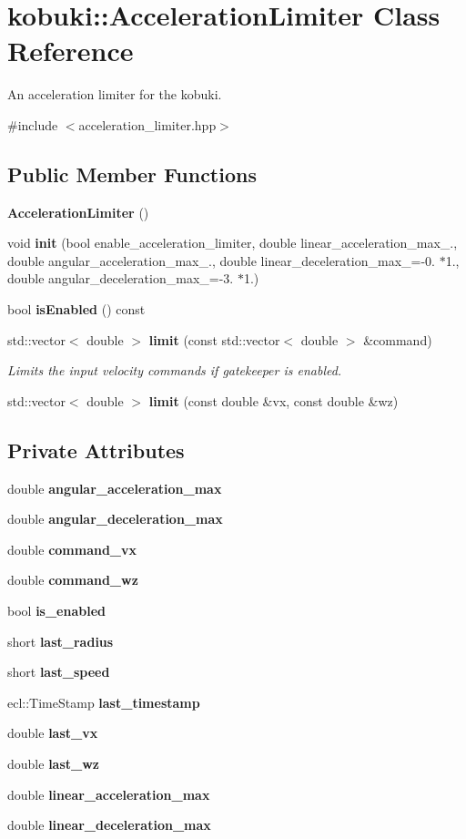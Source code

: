 \section{kobuki\-:\-:\-Acceleration\-Limiter \-Class \-Reference}
\label{classkobuki_1_1AccelerationLimiter}


\-An acceleration limiter for the kobuki.  




{\ttfamily \#include $<$acceleration\-\_\-limiter.\-hpp$>$}

\subsection*{\-Public \-Member \-Functions}
\begin{DoxyCompactItemize}
\item 
{\bf \-Acceleration\-Limiter} ()
\item 
void {\bf init} (bool enable\-\_\-acceleration\-\_\-limiter, double linear\-\_\-acceleration\-\_\-max\-\_., double angular\-\_\-acceleration\-\_\-max\-\_., double linear\-\_\-deceleration\-\_\-max\-\_\-=-\/0. $\ast$1., double angular\-\_\-deceleration\-\_\-max\-\_\-=-\/3. $\ast$1.)
\item 
bool {\bf is\-Enabled} () const 
\item 
std\-::vector$<$ double $>$ {\bf limit} (const std\-::vector$<$ double $>$ \&command)
\begin{DoxyCompactList}\small\item\em \-Limits the input velocity commands if gatekeeper is enabled. \end{DoxyCompactList}\item 
std\-::vector$<$ double $>$ {\bf limit} (const double \&vx, const double \&wz)
\end{DoxyCompactItemize}
\subsection*{\-Private \-Attributes}
\begin{DoxyCompactItemize}
\item 
double {\bf angular\-\_\-acceleration\-\_\-max}
\item 
double {\bf angular\-\_\-deceleration\-\_\-max}
\item 
double {\bf command\-\_\-vx}
\item 
double {\bf command\-\_\-wz}
\item 
bool {\bf is\-\_\-enabled}
\item 
short {\bf last\-\_\-radius}
\item 
short {\bf last\-\_\-speed}
\item 
ecl\-::\-Time\-Stamp {\bf last\-\_\-timestamp}
\item 
double {\bf last\-\_\-vx}
\item 
double {\bf last\-\_\-wz}
\item 
double {\bf linear\-\_\-acceleration\-\_\-max}
\item 
double {\bf linear\-\_\-deceleration\-\_\-max}
\end{DoxyCompactItemize}


